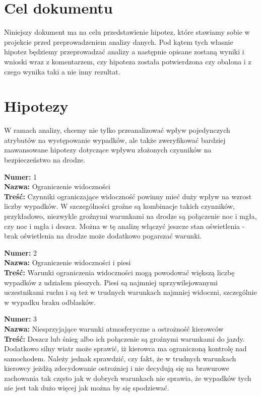 \section{Cel dokumentu}\label{cel-dokumentu}

Niniejszy dokument ma na celu przedstawienie hipotez, które stawiamy
sobie w projekcie przed preprowadzeniem analizy danych. Pod kątem tych
własnie hipotez będziemy przeprowadzać analizy a następnie opisane
zostaną wyniki i wnioski wraz z komentarzem, czy hipoteza została
potwierdzona czy obalona i z czego wynika taki a nie inny rezultat.

\section{Hipotezy}\label{hipotezy}

W ramach analizy, chcemy nie tylko przeanalizować wpływ pojedynczych
atrybutów na występowanie wypadków, ale także zweryfikować bardziej
zaawansowane hipotezy dotyczące wpływu złożonych czynników na
bezpieczeństwo na drodze.

\textbf{Numer:} 1\\\textbf{Nazwa:} Ograniczenie
widoczności\\\textbf{Treść:} Czynniki ograniczające widoczność powinny
mieć duży wpływ na wzrost liczby wypadków. W szczególności groźne są
kombinacje takich czynników, przykładowo, niezwykle groźnymi warunkami
na drodze są połączenie noc i mgła, czy noc i mgła i deszcz. Można w tę
analizę włączyć jeszcze stan oświetlenia - brak oświetlenia na drodze
może dodatkowo pogarszać warunki.

\textbf{Numer:} 2\\\textbf{Nazwa:} Ograniczenie widoczności i
piesi\\\textbf{Treść:} Warunki ograniczenia widoczności mogą powodować
większą liczbę wypadków z udziałem pieszych. Piesi są najmniej
uprzywilejowanymi uczestnikami ruchu i są też w trudnych warunkach
najmniej widoczni, szczególnie w wypadku braku odblasków.

\textbf{Numer:} 3\\\textbf{Nazwa:} Niesprzyjające warunki atmosferyczne
a ostrożność kierowców\\\textbf{Treść:} Deszcz lub śnieg albo ich
połączenie są groźnymi warunkami do jazdy. Dodatkowo silny wiatr może
sprawić, iż kierowca ma ograniczoną kontrolę nad samochodem. Należy
jednak sprawdzić, czy fakt, że w trudnych warunkach kierowcy jeżdżą
zdecydowanie ostrożniej i nie decydują się na brawurowe zachowania tak
często jak w dobrych warunkach nie sprawia, że wypadków tych nie jest
tak dużo więcej jak można by się spodziewać.

